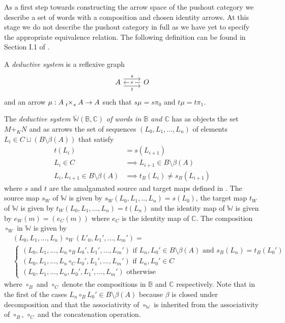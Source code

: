 \documentclass{article}
\begin{document}
As a first step towards constructing the arrow space of the pushout category we describe a set of words with a composition and chosen identity arrows.
At this stage we do not describe the pushout category in full as we have yet to specify the appropriate equivalence relation.
The following definition can be found in Section I.1 of \cite{MR939612}.

\begin{definition}
	A \emph{deductive system} is a reflexive graph
	\begin{equation*}
		\begin{tikzcd}
			A \rar[yshift=0.5em]{s} \rar[yshift=-0.5em][swap]{t} & O \arrow{l}[description]{e}
		\end{tikzcd}
	\end{equation*}
	and an arrow $\mu:A\tensor[_t]{\times}{_s} A\rightarrow A$ such that $s\mu = s\pi_0$ and $t\mu = t\pi_1$.
\end{definition}

\begin{definition}\label{deductive-system-of-words}
	The \emph{deductive system $\overline{\mathbb{W}}(\mathbb{B},\mathbb{C})$ of words in $\mathbb{B}$ and $\mathbb{C}$} has as objects the set $M+_K N$ and as arrows the set of sequences $(L_0,L_1,...,L_n)$ of elements $L_i\in C\sqcup (B\setminus \beta(A))$ that satisfy
	\begin{align*}
		t(L_{i})&=s(L_{i+1})\\
		L_i \in C&\implies L_{i+1}\in B\setminus \beta(A)\\
		L_i,L_{i+1}\in B\setminus \beta(A)&\implies t_B(L_{i}) \neq s_B(L_{i+1})
	\end{align*}
	where $s$ and $t$ are the amalgamated source and target maps defined in .
	The source map $s_W$ of $\mathbb{W}$ is given by $s_W(L_0,L_1,..,L_n)=s(L_0)$, the target map $t_W$ of $\mathbb{W}$ is given by $t_W(L_0,L_1,...,L_n)=t(L_n)$ and the identity map of $\mathbb{W}$ is given by $e_W(m)=(e_C(m))$ where $e_C$ is the identity map of $\mathbb{C}$.
	The composition $\circ_W$ in $\mathbb{W}$ is given by
	\begin{align*}
		&(L_0,L_1,...,L_n)\circ_W (L'_0,L_1',...,L_m')=\\
	 	&\begin{cases}
	 		(L_0,L_1,...,L_n\circ_B L_0',L_1',...,L_m') \text{ if $L_n,L_0'\in B\setminus \beta(A)$ and $s_B(L_n)=t_B(L_0')$}\\
	 		(L_0,L_1,...,L_n\circ_C L_0',L_1',...,L_m') \text{ if $L_n,L_0'\in C$}\\
	 		(L_0,L_1,...,L_n,L_0',L_1',...,L_m') \text{ otherwise}
	 	\end{cases}
	 \end{align*}
	 where $\circ_B$ and $\circ_C$ denote the compositions in $\mathbb{B}$ and $\mathbb{C}$ respectively.
	 Note that in the first of the cases $L_n\circ_B L_0'\in B \setminus \beta(A)$ because $\beta$ is closed under decomposition and that the associativity of $\circ_{\mathbb{W}}$ is inherited from the associativity of $\circ_B$, $\circ_C$ and the concatenation operation.
\end{definition}
\end{document}
